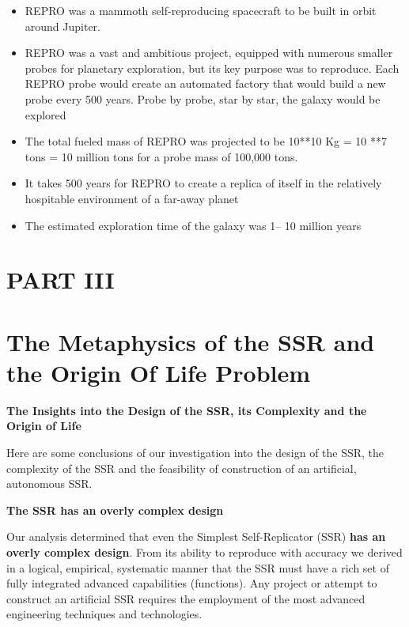 \begin{itemize}
\item REPRO was a mammoth self-reproducing spacecraft to be built in
orbit around Jupiter.
\item REPRO was a vast and ambitious project, equipped with numerous
smaller probes for planetary exploration, but its key purpose was to
reproduce. Each REPRO probe would create an automated factory that
would build a new probe every 500 years. Probe by probe, star by star,
the galaxy would be explored 
\item The total fueled mass of REPRO was projected to be 10**10 Kg = 10
**7 tons = 10 million tons for a probe mass of 100,000 tons.
\item It takes 500 years for REPRO to create a replica of itself in the
relatively hospitable environment of a far-away planet
\item The estimated exploration time of the galaxy was 1– 10 million
years
\end{itemize}
\clearpage\section[PART III]{PART III}
\hypertarget{RefHeading3158306210128}{}\section[The Metaphysics of the
SSR and the Origin Of Life Problem]{The Metaphysics of the SSR and the
Origin Of Life Problem}
\hypertarget{RefHeading3160306210128}{}
\bigskip

{\bfseries
\hypertarget{RefHeading3162306210128}{}The Insights into the Design of
the SSR, its Complexity and the Origin of Life}

Here are some conclusions of our investigation into the design of the
SSR, the complexity of the SSR and the feasibility of construction of
an artificial, autonomous SSR.


\bigskip

\textbf{The SSR has an overly complex design}


\bigskip

Our analysis determined that even the Simplest Self-Replicator (SSR)
\textbf{has an overly complex design}. From its ability to reproduce
with accuracy we derived in a logical, empirical, systematic manner
that the SSR must have a rich set of fully integrated advanced
capabilities (functions).  Any project or attempt to construct an
artificial SSR requires the employment of the most advanced engineering
techniques and technologies.



